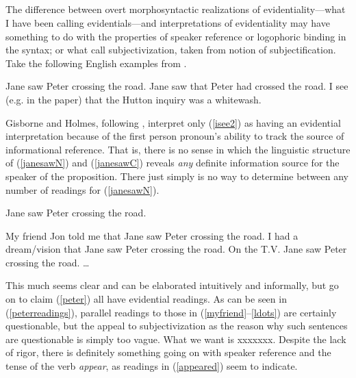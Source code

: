 \documentclass{article}
\begin{document}
\subsection{\cite{gisborneholmes:2007}} 
The difference between overt morphosyntactic realizations of evidentiality---what I have been calling evidentials---and interpretations of evidentiality may have something to do with the properties of speaker reference or logophoric binding in the syntax; or what \cite{gisborneholmes:2007} call subjectivization, taken from  notion of subjectification. Take the following English examples from .

\begin{exe}
\ex
\begin{xlist}
\ex Jane saw Peter crossing the road.\label{janesawN}
\ex Jane saw that Peter had crossed the road.\label{janesawC}
\ex I see (e.g. in the paper) that the Hutton inquiry was a whitewash.\label{isee2}
\end{xlist}
\end{exe} 

Gisborne and Holmes, following \cite{dehaan01relation}, interpret only (\ref{isee2}) as having an evidential interpretation because of the first person pronoun's ability to track the source of informational reference. That is, there is no sense in which the linguistic structure of (\ref{janesawN}) and (\ref{janesawC}) reveals \textsl{any} definite information source for the speaker of the proposition. There just simply is no way to determine between any number of readings for (\ref{janesawN}).  

\begin{exe}
\ex Jane saw Peter crossing the road.
\begin{xlist}
\ex My friend Jon told me that Jane saw Peter crossing the road.\label{myfriend}
\ex I had a dream/vision that Jane saw Peter crossing the road.
\ex On the T.V. Jane saw Peter crossing the road.
\ex \dots \label{ldots}
\end{xlist}
\end{exe}

This much seems clear and can be elaborated intuitively and informally, but  go on to claim (\ref{peter}) all have evidential readings. As can be seen in (\ref{peterreadings}), parallel readings to those in (\ref{myfriend}--\ref{ldots}) are certainly questionable, but the appeal to subjectivization as the reason why such sentences are questionable is simply too vague. What we want is xxxxxxx. Despite the lack of rigor, there is definitely something going on with speaker reference and the tense of the verb \textsl{appear}, as readings in (\ref{appeared}) seem to indicate.
\end{document}
